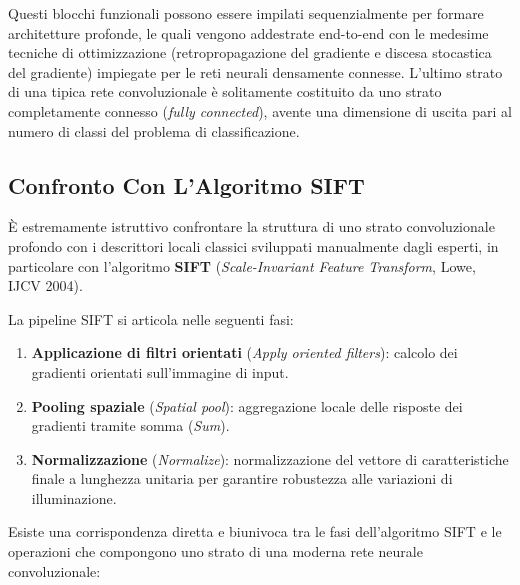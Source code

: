 ﻿\documentclass[11pt, a4paper]{article}
\begin{document}

Questi blocchi funzionali possono essere impilati sequenzialmente per formare architetture profonde, le quali vengono addestrate end-to-end con le medesime tecniche di ottimizzazione (retropropagazione del gradiente e discesa stocastica del gradiente) impiegate per le reti neurali densamente connesse. L'ultimo strato di una tipica rete convoluzionale è solitamente costituito da uno strato completamente connesso (\emph{fully connected}), avente una dimensione di uscita pari al numero di classi del problema di classificazione.

\newpage

\subsection{Confronto Con L'Algoritmo SIFT}

È estremamente istruttivo confrontare la struttura di uno strato convoluzionale profondo con i descrittori locali classici sviluppati manualmente dagli esperti, in particolare con l'algoritmo \textbf{SIFT} (\emph{Scale-Invariant Feature Transform}, Lowe, IJCV 2004).

La pipeline SIFT si articola nelle seguenti fasi:
\begin{enumerate}
    \item \textbf{Applicazione di filtri orientati} (\emph{Apply oriented filters}): calcolo dei gradienti orientati sull'immagine di input.
    \item \textbf{Pooling spaziale} (\emph{Spatial pool}): aggregazione locale delle risposte dei gradienti tramite somma (\emph{Sum}).
    \item \textbf{Normalizzazione} (\emph{Normalize}): normalizzazione del vettore di caratteristiche finale a lunghezza unitaria per garantire robustezza alle variazioni di illuminazione.
\end{enumerate}


Esiste una corrispondenza diretta e biunivoca tra le fasi dell'algoritmo SIFT e le operazioni che compongono uno strato di una moderna rete neurale convoluzionale:

\end{document}
